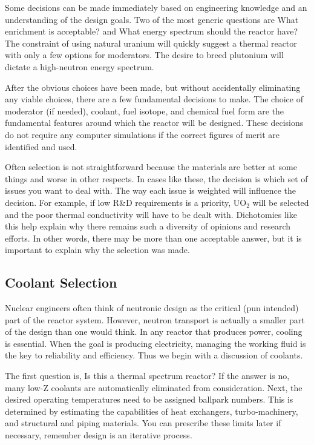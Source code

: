 Some decisions can be made immediately based on engineering knowledge and an understanding of the design goals. Two of the most generic questions are What enrichment is acceptable? and What energy spectrum should the reactor have? The constraint of using natural uranium will quickly suggest a thermal reactor with only a few options for moderators. The desire to breed plutonium will dictate a high-neutron energy spectrum. 

After the obvious choices have been made, but without accidentally eliminating any viable choices, there are a few fundamental decisions to make. The choice of moderator (if needed), coolant, fuel isotope, and chemical fuel form are the fundamental features around which the reactor will be designed. These decisions do not require any computer simulations if the correct figures of merit are identified and used. 

Often selection is not straightforward because the materials are better at some things and worse in other respects. In cases like these, the decision is which set of issues you want to deal with.
The way each issue is weighted will influence the decision. For example, if low R\&D requirements is a priority, UO$_2$ will be selected and the poor thermal conductivity will have to be dealt with. 
Dichotomies like this help explain why there remains such a diversity of opinions and research efforts.
In other words, there may be more than one acceptable answer, but it is important to explain why the selection was made.


\subsection{Coolant Selection}
Nuclear engineers often think of neutronic design as the critical (pun intended) part of the reactor system. However, neutron transport is actually a smaller part of the design than one would think.
In any reactor that produces power, cooling is essential. When the goal is producing electricity, managing the working fluid is the key to reliability and efficiency. Thus we begin with a discussion of coolants.

The first question is, Is this a thermal spectrum reactor? If the answer is no, many low-Z coolants are automatically eliminated from consideration.
Next, the desired operating temperatures need to be assigned ballpark numbers. This is determined by estimating the capabilities of heat exchangers, turbo-machinery, and structural and piping materials. You can prescribe these limits later if necessary, remember design is an iterative process. 

